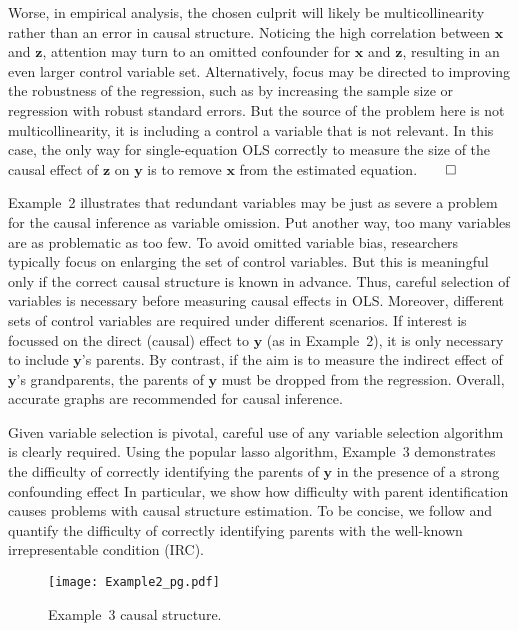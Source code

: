 \documentclass[11pt,review,authoryear]{elsarticle}
\begin{document}
Worse, in empirical analysis, the chosen culprit will likely be multicollinearity rather than an error in causal structure. Noticing the high correlation between $\mathbf{x}$ and $\mathbf{z}$, attention may turn to an omitted confounder for $\mathbf{x}$ and $\mathbf{z}$, resulting in an even larger control variable set. Alternatively, focus may be directed to improving the robustness of the regression, such as by increasing the sample size or regression with robust standard errors. But the source of the problem here is  not multicollinearity, it is including a control a variable that is not relevant. In this case, the only way for single-equation OLS correctly to measure the size of the causal effect of $\mathbf{z}$ on $\mathbf{y}$ is to remove $\mathbf{x}$ from the estimated equation.$\qed$
\medskip

Example~2 illustrates that redundant variables may be just as severe a problem for the causal inference as variable omission. Put another way, too many variables are as problematic as too few. To avoid omitted variable bias, researchers typically focus on enlarging the set of control variables. But this is meaningful only if the correct causal structure is known in advance. Thus, careful selection of variables is necessary before measuring causal effects in OLS. Moreover, different sets of control variables are required under different scenarios. If interest is focussed on the direct (causal) effect to $\mathbf{y}$ (as in Example~2), it is only necessary to include $\mathbf{y}$'s parents. By contrast, if the aim is to measure the indirect effect of $\mathbf{y}$'s grandparents, the parents of $\mathbf{y}$ must be dropped from the regression. Overall, accurate graphs are recommended for causal inference.

Given variable selection is pivotal, careful use of any variable selection algorithm is clearly required. Using the popular lasso algorithm, Example~3 demonstrates the difficulty of correctly identifying the parents of $\mathbf{y}$ in the presence of a strong confounding effect In particular, we show how difficulty with parent identification causes problems with causal structure estimation. To be concise, we follow \citet{zhaoyu06, tibshirani2012strong} and quantify the difficulty of correctly identifying parents with the well-known irrepresentable condition (IRC).

\begin{figure}[H]
  \centering
  \texttt{[image: Example2\_pg.pdf]}
  \caption{Example~3 causal structure.}
  \label{fig:example_2}
%
\end{figure}
\end{document}
